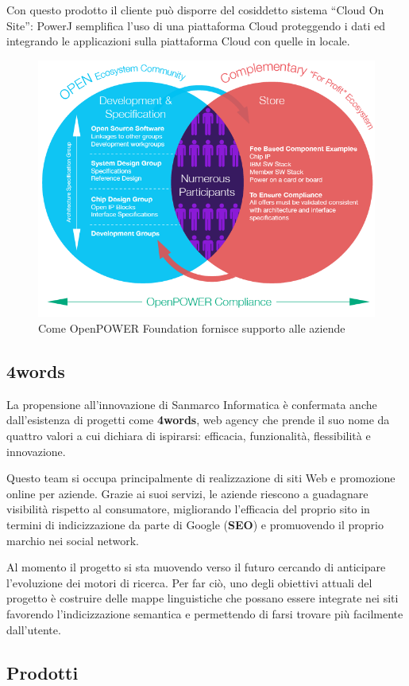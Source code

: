 Con questo prodotto il cliente può disporre del cosiddetto sistema ``Cloud On
Site'': PowerJ semplifica l'uso di una piattaforma Cloud proteggendo i dati ed
integrando le applicazioni sulla piattaforma Cloud con quelle in locale.

\begin{figure}%
\centering
\includegraphics[width=.7\columnwidth]{immagini/open-power-foundation}%
\caption{Come OpenPOWER Foundation fornisce supporto alle aziende}%
\label{fig:open-power-foundation}%
\end{figure}

\subsection{4words} \mbox{}

La propensione all'innovazione di Sanmarco Informatica è confermata anche
dall'esistenza di progetti come \textbf{4words}, web agency che prende il suo
nome da quattro valori a cui dichiara di ispirarsi: efficacia, funzionalità,
flessibilità e innovazione.

Questo team si occupa principalmente di realizzazione di siti Web e promozione
online per aziende. Grazie ai suoi servizi, le aziende riescono a guadagnare
visibilità rispetto al consumatore, migliorando l'efficacia del proprio sito in
termini di indicizzazione da parte di Google (\textbf{SEO}) e promuovendo il
proprio marchio nei social network.

Al momento il progetto si sta muovendo verso il futuro cercando di anticipare
l'evoluzione dei motori di ricerca. Per far ciò, uno degli obiettivi attuali
del progetto è costruire delle mappe linguistiche che possano essere integrate
nei siti favorendo l'indicizzazione semantica e permettendo di farsi trovare
più facilmente dall'utente.

\subsection{Prodotti} \mbox{}

